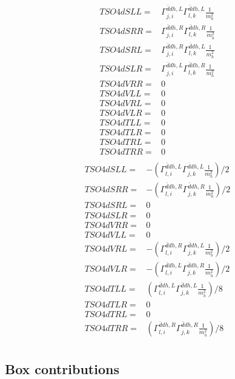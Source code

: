 \documentclass[A4,landscape]{article}
\begin{document}
\begin{align} 
  TSO4dSLL= & \Gamma^{\bar{d}d h ,L}_{j, i} \Gamma^{\bar{d}d h ,L}_{l, k} \frac{1}{m^2_{h}} \\ 
  TSO4dSRR= & \Gamma^{\bar{d}d h ,R}_{j, i} \Gamma^{\bar{d}d h ,R}_{l, k} \frac{1}{m^2_{h}} \\ 
  TSO4dSRL= & \Gamma^{\bar{d}d h ,R}_{j, i} \Gamma^{\bar{d}d h ,L}_{l, k} \frac{1}{m^2_{h}} \\ 
  TSO4dSLR= & \Gamma^{\bar{d}d h ,L}_{j, i} \Gamma^{\bar{d}d h ,R}_{l, k} \frac{1}{m^2_{h}} \\ 
  TSO4dVRR= & 0 \\ 
  TSO4dVLL= & 0 \\ 
  TSO4dVRL= & 0 \\ 
  TSO4dVLR= & 0 \\ 
  TSO4dTLL= & 0 \\ 
  TSO4dTLR= & 0 \\ 
  TSO4dTRL= & 0 \\ 
  TSO4dTRR= & 0 \\ 
\end{align} 
\begin{align} 
  TSO4dSLL= & -(\Gamma^{\bar{d}d h ,L}_{l, i} \Gamma^{\bar{d}d h ,L}_{j, k} \frac{1}{m^2_{h}})/2 \\ 
  TSO4dSRR= & -(\Gamma^{\bar{d}d h ,R}_{l, i} \Gamma^{\bar{d}d h ,R}_{j, k} \frac{1}{m^2_{h}})/2 \\ 
  TSO4dSRL= & 0 \\ 
  TSO4dSLR= & 0 \\ 
  TSO4dVRR= & 0 \\ 
  TSO4dVLL= & 0 \\ 
  TSO4dVRL= & -(\Gamma^{\bar{d}d h ,R}_{l, i} \Gamma^{\bar{d}d h ,L}_{j, k} \frac{1}{m^2_{h}})/2 \\ 
  TSO4dVLR= & -(\Gamma^{\bar{d}d h ,L}_{l, i} \Gamma^{\bar{d}d h ,R}_{j, k} \frac{1}{m^2_{h}})/2 \\ 
  TSO4dTLL= & (\Gamma^{\bar{d}d h ,L}_{l, i} \Gamma^{\bar{d}d h ,L}_{j, k} \frac{1}{m^2_{h}})/8 \\ 
  TSO4dTLR= & 0 \\ 
  TSO4dTRL= & 0 \\ 
  TSO4dTRR= & (\Gamma^{\bar{d}d h ,R}_{l, i} \Gamma^{\bar{d}d h ,R}_{j, k} \frac{1}{m^2_{h}})/8 \\ 
\end{align} 
\subsection{Box contributions} 
\end{document}

